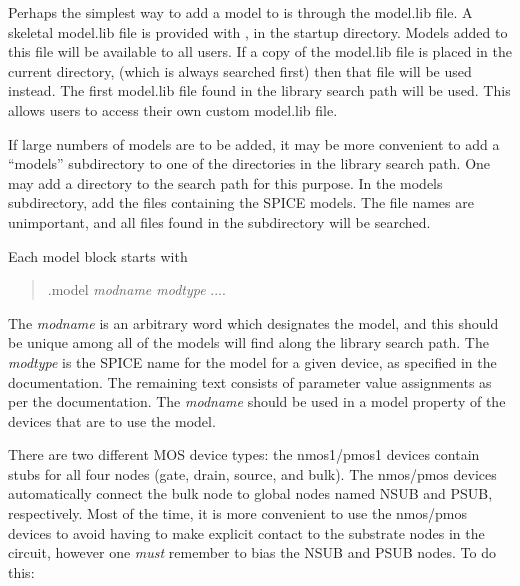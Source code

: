 Perhaps the simplest way to add a model to {\Xic} is through the {\vt
model.lib} file.  A skeletal {\vt model.lib} file is provided with
{\Xic}, in the startup directory.  Models added to this file will be
available to all users.  If a copy of the {\vt model.lib} file is
placed in the current directory, (which is always searched first) then
that file will be used instead.  The first {\vt model.lib} file found
in the library search path will be used.  This allows users to access
their own custom {\vt model.lib} file.

If large numbers of models are to be added, it may be more convenient
to add a ``{\vt models}'' subdirectory to one of the directories in
the library search path.  One may add a directory to the search path
for this purpose.  In the models subdirectory, add the files
containing the SPICE models.  The file names are unimportant, and all
files found in the subdirectory will be searched.

Each model block starts with
\begin{quote}
{\vt .model} {\it modname modtype} ....
\end{quote}

The {\it modname} is an arbitrary word which designates the model, and
this should be unique among all of the models {\Xic} will find along
the library search path.  The {\it modtype} is the SPICE name for the
model for a given device, as specified in the {\WRspice}
documentation.  The remaining text consists of parameter value
assignments as per the documentation.  The {\it modname} should be
used in a {\et model} property of the devices that are to use the
model.

There are two different MOS device types:  the {\et nmos1}/{\et pmos1}
devices contain stubs for all four nodes (gate, drain, source, and
bulk).  The {\et nmos}/{\et pmos} devices automatically connect the
bulk node to global nodes named NSUB and PSUB, respectively.  Most of
the time, it is more convenient to use the {\et nmos}/{\et pmos}
devices to avoid having to make explicit contact to the substrate
nodes in the circuit, however one {\it must} remember to bias the NSUB
and PSUB nodes.  To do this:

